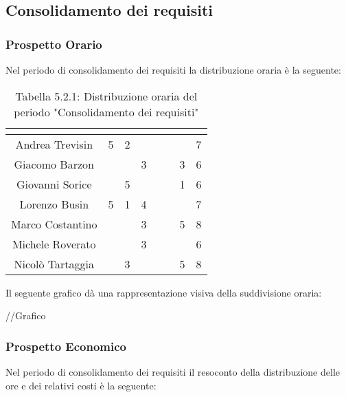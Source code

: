 \subsection{Consolidamento dei requisiti}

\subsubsection{Prospetto Orario}
Nel periodo di consolidamento dei requisiti la distribuzione oraria è la seguente:

\renewcommand{\arraystretch}{1.5}
\begin{table}[H]
\begin{center}
\begin{tabular}{|c|c|c|c|c|c|c|c|}
\hline
\rowcolor{title_row}
\textbf{\color{title_text}{Nome}} & \textbf{\color{title_text}{Resp.}} & \textbf{\color{title_text}{Ammi.}} & \textbf{\color{title_text}{Analist.}} & \textbf{\color{title_text}{Progett.}} & \textbf{\color{title_text}{Program.}} & \textbf{\color{title_text}{Verific.}} & \textbf{\color{title_text}{Totale}} \\ \hline
Andrea Trevisin  & 5 & 2 & & & & & 7 \\ \hline
Giacomo Barzon   & & & 3 & & & 3 & 6 \\ \hline
Giovanni Sorice  & & 5 & & & & 1 & 6 \\ \hline
Lorenzo Busin    & 5 & 1 & 4 & & & & 7 \\ \hline
Marco Costantino & & & 3 & & & 5 & 8 \\ \hline
Michele Roverato & & & 3 & & & & 6 \\ \hline
Nicolò Tartaggia & & 3 & & & & 5 & 8 \\ \hline
\end{tabular}
\caption{Tabella 5.2.1: Distribuzione oraria del periodo "Consolidamento dei requisiti"\label{}}
\end{center}
\end{table}
\renewcommand{\arraystretch}{1}

Il seguente grafico dà una rappresentazione visiva della suddivisione oraria: \\
\begin{center}
//Grafico
\end{center}


\subsubsection{Prospetto Economico}
Nel periodo di consolidamento dei requisiti il resoconto della distribuzione delle ore e dei relativi costi è la seguente:

